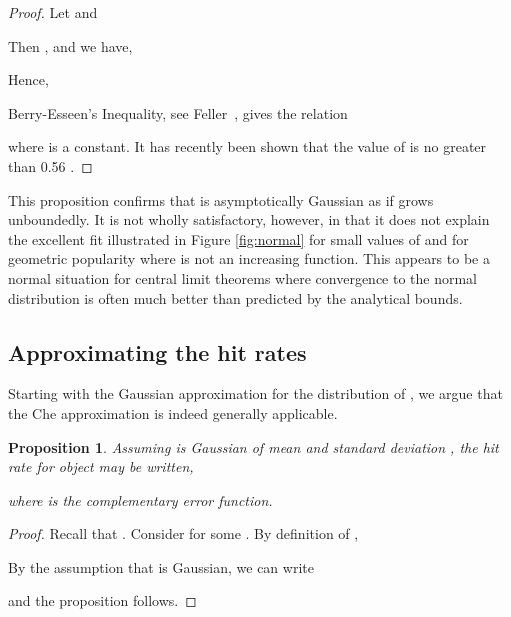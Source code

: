 \documentclass{amsart}
\newtheorem{proposition}{Proposition}
\begin{document}
\begin{proof}
Let   and

Then ,   and we have,

Hence,


Berry-Esseen's Inequality, see Feller~\cite[p.~544]{Feller}, gives  the relation

where  is a constant. It has recently been shown that the value of  is no greater than 0.56 \cite{Shevstova2010}.
\end{proof}

This proposition confirms that  is asymptotically Gaussian as  if  grows unboundedly. It is not wholly satisfactory, however, in that it does not explain the excellent fit illustrated in Figure \ref{fig:normal} for small values of  and for geometric popularity where  is not an increasing function. This appears to be a normal situation for central limit theorems where convergence to the normal distribution is often much better than predicted by the analytical bounds.


\subsection{Approximating the hit rates}
Starting with the Gaussian approximation for the distribution of , we argue that the Che approximation is indeed generally applicable.



\begin{proposition}
\label{prop:erfc}
Assuming  is Gaussian of mean  and standard deviation , the hit rate for object  may be written,

where  is the complementary error function.
\end{proposition}

\begin{proof}
Recall that . Consider  for some .
By definition of ,


By the assumption that  is Gaussian, we can write

and the proposition follows.
\end{proof}
\end{document}
